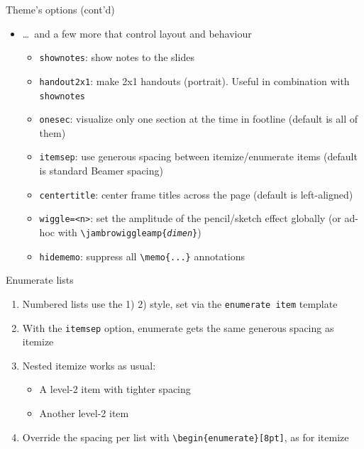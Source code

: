 \documentclass[10pt,itemsep]{beamer}
\begin{document}
\begin{frame}
    {Theme's options (cont'd)}
    \begin{itemize}
        \item \dots\ and a few more that control layout and behaviour
        \begin{itemize}
            \item \texttt{shownotes}: show notes to the slides
            \item \texttt{handout2x1}: make 2x1 handouts (portrait). Useful in combination with \texttt{shownotes}
            \item \texttt{onesec}: visualize only one section at the time in footline (default is all of them)
            \item \texttt{itemsep}: use generous spacing between itemize/enumerate items (default is standard Beamer spacing)
            \item \texttt{centertitle}: center frame titles across the page (default is left-aligned)
            \item \texttt{wiggle=<n>}: set the amplitude of the pencil/sketch effect globally (or ad-hoc with \texttt{\textbackslash jambrowiggleamp\{\textit{dimen}\}})
            \item \texttt{hidememo}: suppress all \texttt{\textbackslash memo\{...\}} annotations
        \end{itemize}
    \end{itemize}
\end{frame}
\shownotesblock{}

\begin{frame}
    {Enumerate lists}
    \begin{enumerate}
        \item Numbered lists use the 1) 2) style, set via the \texttt{enumerate item} template
        \item With the \texttt{itemsep} option, enumerate gets the same generous spacing as itemize
        \item Nested itemize works as usual:
        \begin{itemize}
            \item A level-2 item with tighter spacing
            \item Another level-2 item
        \end{itemize}
        \item Override the spacing per list with \texttt{\textbackslash begin\{enumerate\}[8pt]}, as for itemize
    \end{enumerate}
\end{frame}
\shownotesblock{}
\end{document}
